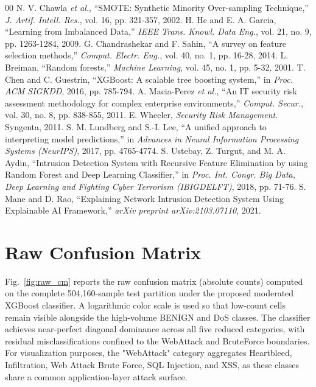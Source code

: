 \documentclass[conference]{IEEEtran}
\begin{document}
\begin{thebibliography}{00}
 N. V. Chawla \emph{et al.}, ``SMOTE: Synthetic Minority Over-sampling Technique,'' \emph{J. Artif. Intell. Res.}, vol. 16, pp. 321-357, 2002.
 H. He and E. A. Garcia, ``Learning from Imbalanced Data,'' \emph{IEEE Trans. Knowl. Data Eng.}, vol. 21, no. 9, pp. 1263-1284, 2009.
 G. Chandrashekar and F. Sahin, ``A survey on feature selection methods,'' \emph{Comput. Electr. Eng.}, vol. 40, no. 1, pp. 16-28, 2014.
 L. Breiman, ``Random forests,'' \emph{Machine Learning}, vol. 45, no. 1, pp. 5-32, 2001.
 T. Chen and C. Guestrin, ``XGBoost: A scalable tree boosting system,'' in \emph{Proc. ACM SIGKDD}, 2016, pp. 785-794.
 A. Macia-Perez \emph{et al.}, ``An IT security risk assessment methodology for complex enterprise environments,'' \emph{Comput. Secur.}, vol. 30, no. 8, pp. 838-855, 2011.
 E. Wheeler, \emph{Security Risk Management}. Syngenta, 2011.
 S. M. Lundberg and S.-I. Lee, ``A unified approach to interpreting model predictions,'' in \emph{Advances in Neural Information Processing Systems (NeurIPS)}, 2017, pp. 4765-4774.
 S. Ustebay, Z. Turgut, and M. A. Aydin, ``Intrusion Detection System with Recursive Feature Elimination by using Random Forest and Deep Learning Classifier,'' in \emph{Proc. Int. Congr. Big Data, Deep Learning and Fighting Cyber Terrorism (IBIGDELFT)}, 2018, pp. 71-76.
 S. Mane and D. Rao, ``Explaining Network Intrusion Detection System Using Explainable AI Framework,'' \emph{arXiv preprint arXiv:2103.07110}, 2021.
\end{thebibliography}

\appendices

\section{Raw Confusion Matrix}
\label{app:raw_cm}

Fig.~\ref{fig:raw_cm} reports the raw confusion matrix (absolute 
counts) computed on the complete 504{,}160-sample test partition under 
the proposed moderated XGBoost classifier. A logarithmic color scale 
is used so that low-count cells remain visible alongside the 
high-volume BENIGN and DoS classes. The classifier achieves 
near-perfect diagonal dominance across all five reduced categories, 
with residual misclassifications confined to the WebAttack and 
BruteForce boundaries. For visualization purposes, the "WebAttack" 
category aggregates Heartbleed, Infiltration, Web Attack Brute Force, 
SQL Injection, and XSS, as these classes share a common 
application-layer attack surface.
\end{document}
